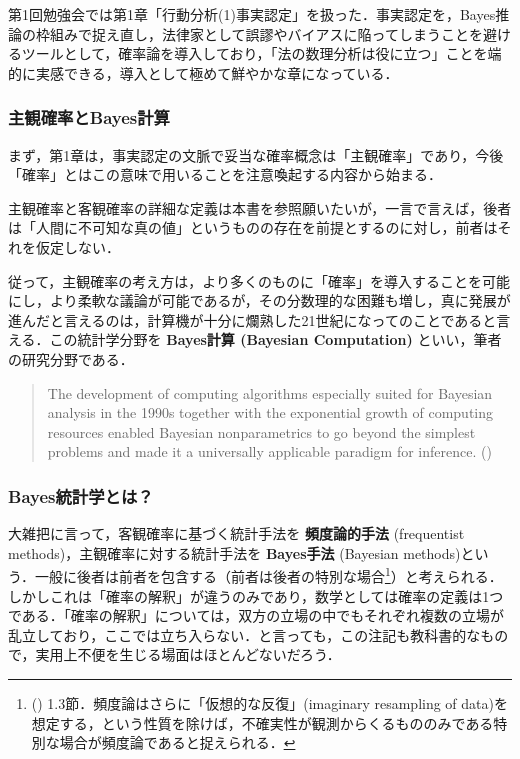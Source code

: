 \documentclass[
  letterpaper,
  DIV=11,
  numbers=noendperiod]{scrartcl}
\begin{document}
第1回勉強会では第1章「行動分析(1)事実認定」を扱った．事実認定を，Bayes推論の枠組みで捉え直し，法律家として誤謬やバイアスに陥ってしまうことを避けるツールとして，確率論を導入しており，「法の数理分析は役に立つ」ことを端的に実感できる，導入として極めて鮮やかな章になっている．

\subsubsection{主観確率とBayes計算}\label{ux4e3bux89b3ux78baux7387ux3068bayesux8a08ux7b97}

まず，第1章は，事実認定の文脈で妥当な確率概念は「主観確率」であり，今後「確率」とはこの意味で用いることを注意喚起する内容から始まる．

主観確率と客観確率の詳細な定義は本書を参照願いたいが，一言で言えば，後者は「人間に不可知な真の値」というものの存在を前提とするのに対し，前者はそれを仮定しない．

従って，主観確率の考え方は，より多くのものに「確率」を導入することを可能にし，より柔軟な議論が可能であるが，その分数理的な困難も増し，真に発展が進んだと言えるのは，計算機が十分に爛熟した21世紀になってのことであると言える．この統計学分野を
\textbf{Bayes計算 (Bayesian Computation)} といい，筆者の研究分野である．

\begin{quote}
The development of computing algorithms especially suited for Bayesian
analysis in the 1990s together with the exponential growth of computing
resources enabled Bayesian nonparametrics to go beyond the simplest
problems and made it a universally applicable paradigm for inference.
()
\end{quote}

\subsubsection{Bayes統計学とは？}\label{bayesux7d71ux8a08ux5b66ux3068ux306f}

大雑把に言って，客観確率に基づく統計手法を \textbf{頻度論的手法}
(frequentist methods)，主観確率に対する統計手法を \textbf{Bayes手法}
(Bayesian
methods)という．一般に後者は前者を包含する（前者は後者の特別な場合\footnote{() 1.3節．頻度論はさらに「仮想的な反復」(imaginary resampling of
  data)を想定する，という性質を除けば，不確実性が観測からくるもののみである特別な場合が頻度論であると捉えられる．}）と考えられる．しかしこれは「確率の解釈」が違うのみであり，数学としては確率の定義は1つである．「確率の解釈」については，双方の立場の中でもそれぞれ複数の立場が乱立しており，ここでは立ち入らない．と言っても，この注記も教科書的なもので，実用上不便を生じる場面はほとんどないだろう．
\end{document}
